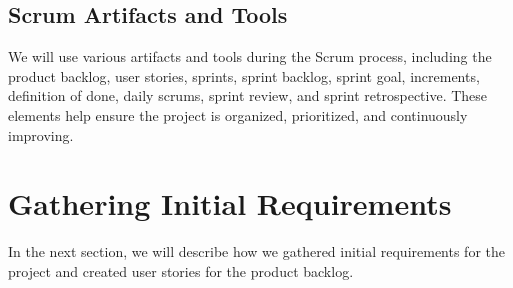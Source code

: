 \subsection{Scrum Artifacts and Tools}
We will use various artifacts and tools during the Scrum process, including the product backlog, user stories, sprints, sprint backlog, sprint goal, increments, definition of done, daily scrums, sprint review, and sprint retrospective. These elements help ensure the project is organized, prioritized, and continuously improving.

\section{Gathering Initial Requirements}
In the next section, we will describe how we gathered initial requirements for the project and created user stories for the product backlog.

